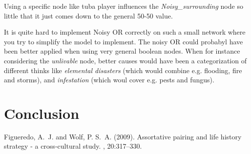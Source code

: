 \documentclass[12pt]{article} %
\begin{document}
Using a specific node like tuba player influences the \emph{Noisy\_surrounding}
node so little that it just comes down to the general 50-50 value.

It is quite hard to implement Noisy OR correctly on such a small network where
you try to simplify the model to implement. The
noisy OR could probabyl have been better applied when using very general boolean
nodes. When for instance considering the \emph{unlivable} node, better causes
would have been a categorization of different thinks like \emph{elemental
disasters} (which would combine e.g. flooding, fire and storms), and
\emph{infestation} (which woul cover e.g. pests and fungus).









\section{Conclusion} %



\begin{thebibliography}{99} %

        Figueredo, A.~J. and Wolf, P. S.~A. (2009).
        \newblock Assortative pairing and life history strategy - a cross-cultural
        study.
        , 20:317--330.

\end{thebibliography}

\end{document}
